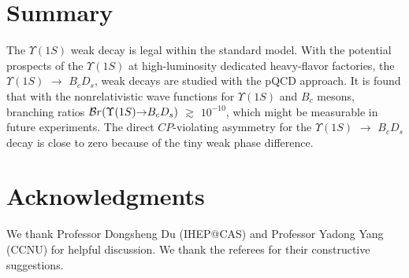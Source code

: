 \documentclass[preprint,superscriptaddress,nofootinbib]{revtex4}
\begin{document}
  \section{Summary}
  \label{sec04}
  The ${\Upsilon}(1S)$ weak decay is legal within
  the standard model.
  With the potential prospects of the ${\Upsilon}(1S)$
  at high-luminosity dedicated heavy-flavor factories,
  the ${\Upsilon}(1S)$ ${\to}$ $B_{c}D_{s}$,
  weak decays are studied with the pQCD approach.
  It is found that with the nonrelativistic wave functions
  for ${\Upsilon}(1S)$ and $B_{c}$ mesons, branching
  ratios ${\cal B}r({\Upsilon}(1S){\to}B_{c}D_{s})$
  ${\gtrsim}$ $10^{-10}$, which might be
  measurable in future experiments. The direct $CP$-violating
  asymmetry for the ${\Upsilon}(1S)$ ${\to}$ $B_{c}D_{s}$
  decay is close to zero because of the tiny weak phase difference.

  \section*{Acknowledgments}
  We thank Professor Dongsheng Du (IHEP@CAS) and Professor
  Yadong Yang (CCNU) for helpful discussion.
  We thank the referees for their constructive suggestions.
\end{document}
